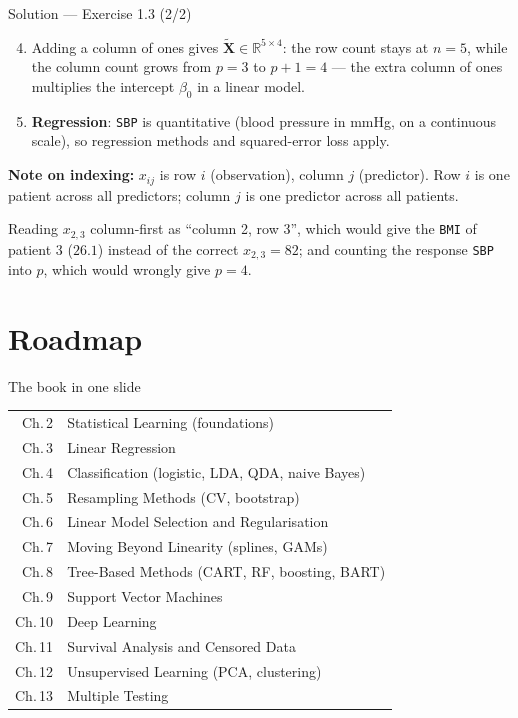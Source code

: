 \documentclass[aspectratio=169,11pt]{beamer}
\begin{document}
\begin{frame}{Solution --- Exercise 1.3 (2/2)}
\begin{solutionbox}
\begin{enumerate}\setcounter{enumi}{3}
  \item Adding a column of ones gives
        $\tilde{\mathbf{X}}\in\mathbb{R}^{5\times 4}$: the row count
        stays at $n=5$, while the column count grows from $p=3$ to
        $p+1=4$ --- the extra column of ones multiplies the intercept
        $\beta_0$ in a linear model.
  \item \textbf{Regression}: \texttt{SBP} is quantitative (blood
        pressure in mmHg, on a continuous scale), so regression
        methods and squared-error loss apply.
\end{enumerate}
\textbf{Note on indexing:} $x_{ij}$ is row $i$ (observation),
column $j$ (predictor). Row $i$ is one patient across all predictors;
column $j$ is one predictor across all patients.
\end{solutionbox}
\begin{mistake}
Reading $x_{2,3}$ column-first as ``column 2,
row 3'', which would give the \texttt{BMI} of patient 3 ($26.1$)
instead of the correct $x_{2,3}=82$; and counting the response
\texttt{SBP} into $p$, which would wrongly give $p=4$.
\end{mistake}
\end{frame}


\section{Roadmap}

\begin{frame}{The book in one slide}
  \begin{tabular}{rl}
    \toprule
    Ch.\,2  & Statistical Learning (foundations) \\
    Ch.\,3  & Linear Regression \\
    Ch.\,4  & Classification (logistic, LDA, QDA, naive Bayes) \\
    Ch.\,5  & Resampling Methods (CV, bootstrap) \\
    Ch.\,6  & Linear Model Selection and Regularisation \\
    Ch.\,7  & Moving Beyond Linearity (splines, GAMs) \\
    Ch.\,8  & Tree-Based Methods (CART, RF, boosting, BART) \\
    Ch.\,9  & Support Vector Machines \\
    Ch.\,10 & Deep Learning \\
    Ch.\,11 & Survival Analysis and Censored Data \\
    Ch.\,12 & Unsupervised Learning (PCA, clustering) \\
    Ch.\,13 & Multiple Testing \\
    \bottomrule
  \end{tabular}
\end{frame}
\end{document}
